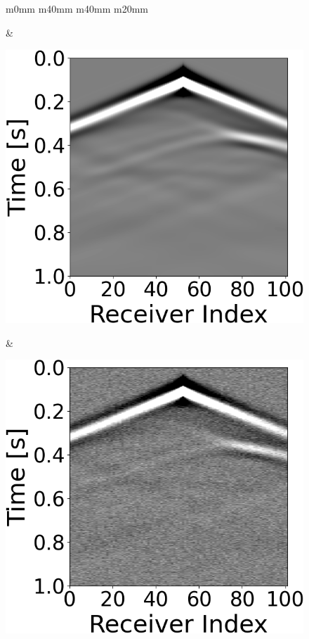 \begin{figure}[t]
    \centering
    \begin{tabular}{m{0mm} m{40mm} m{40mm} m{20mm}}
        \begin{minipage}[b]{\linewidth}\end{minipage} &

        \begin{minipage}[b]{\linewidth}
            \centering
            \includegraphics[width=\linewidth]{public/seismic_data}
            \caption*{}
        \end{minipage} &
        \begin{minipage}[b]{\linewidth}
            \centering
            \includegraphics[width=\linewidth]{public/seismic_data_noisy}

\end{minipage}
\end{tabular}
\end{figure}
